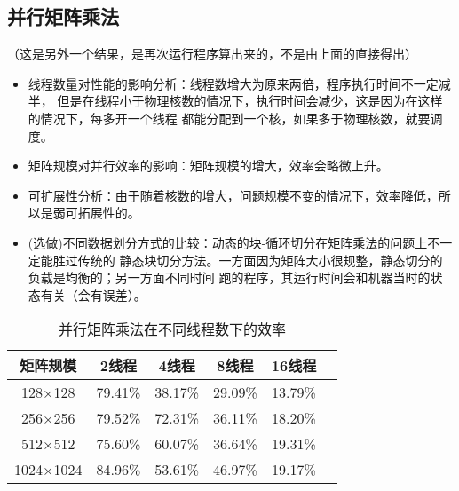 \documentclass{SYSUReport}
\begin{document}
\subsection{并行矩阵乘法}
（这是另外一个结果，是再次运行程序算出来的，不是由上面的直接得出）
\begin{itemize}
    \item 线程数量对性能的影响分析：线程数增大为原来两倍，程序执行时间不一定减半，
    但是在线程小于物理核数的情况下，执行时间会减少，这是因为在这样的情况下，每多开一个线程
    都能分配到一个核，如果多于物理核数，就要调度。
    \item 矩阵规模对并行效率的影响：矩阵规模的增大，效率会略微上升。
    \item 可扩展性分析：由于随着核数的增大，问题规模不变的情况下，效率降低，所以是弱可拓展性的。
    \item (选做)不同数据划分方式的比较：动态的块-循环切分在矩阵乘法的问题上不一定能胜过传统的
    静态块切分方法。一方面因为矩阵大小很规整，静态切分的负载是均衡的；另一方面不同时间
    跑的程序，其运行时间会和机器当时的状态有关（会有误差）。
\end{itemize}
\begin{table}[h]
    \centering
    \caption{并行矩阵乘法在不同线程数下的效率}
    
    \begin{tabular}{cccccc}
    \toprule
    矩阵规模 & 2线程 & 4线程 & 8线程 & 16线程 \\
    \midrule
    128×128  &79.41\% &38.17\% &29.09\% &13.79\% \\
    256×256  &79.52\% &72.31\% &36.11\% &18.20\% \\
    512×512  &75.60\% &60.07\% &36.64\% &19.31\% \\
    1024×1024  &84.96\% &53.61\% &46.97\% &19.17\% \\
\bottomrule
\end{tabular}
\end{table}
\end{document}
